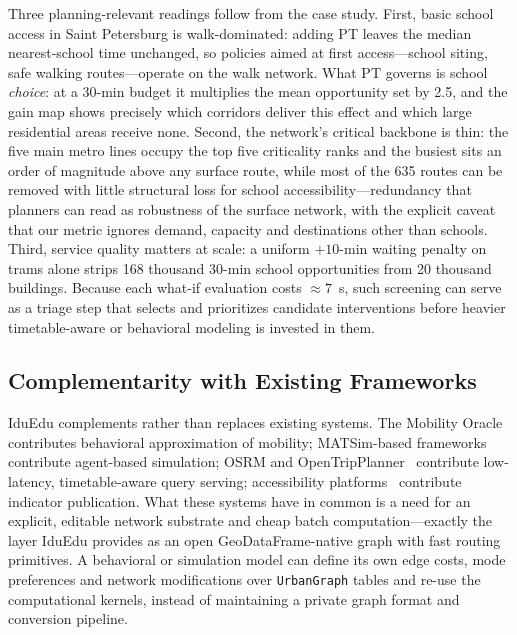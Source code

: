\documentclass[smartcities,article,submit,moreauthors]{Definitions/mdpi}
\begin{document}
    Three planning-relevant readings follow from the case study.
    First, basic school access in Saint Petersburg is walk-dominated: adding PT leaves the median
    nearest-school time unchanged, so policies aimed at first access---school siting, safe walking
    routes---operate on the walk network.
    What PT governs is school \emph{choice}: at a 30-min budget it multiplies the mean opportunity set
    by 2.5, and the gain map shows precisely which corridors deliver this effect and which large
    residential areas receive none.
    Second, the network's critical backbone is thin: the five main metro lines occupy the top five
    criticality ranks and the busiest sits an order of magnitude above any surface route, while most
    of the 635 routes can be removed with little structural loss for school accessibility---redundancy
    that planners can read as robustness of the surface network, with the explicit caveat that our
    metric ignores demand, capacity and destinations other
    than schools.
    Third, service quality matters at scale: a uniform $+10$-min waiting penalty on trams alone strips
    168 thousand 30-min school opportunities from 20 thousand buildings.
    Because each what-if evaluation costs ${\approx}7$~s, such screening can serve as a triage step
    that selects and prioritizes candidate interventions before heavier timetable-aware or behavioral
    modeling is invested in them.

    \subsection{Complementarity with Existing Frameworks}
    \label{subsec:disc-complementarity}

    IduEdu complements rather than replaces existing systems.
    The Mobility Oracle~\cite{gogousou2026mobilityoracle} contributes behavioral approximation of
    mobility; MATSim-based frameworks~\cite{shulajkovska2024framework} contribute agent-based
    simulation; OSRM and OpenTripPlanner~\cite{osrm,otp} contribute low-latency, timetable-aware query
    serving; accessibility platforms~\cite{gumina2026mapping} contribute indicator publication.
    What these systems have in common is a need for an explicit, editable network substrate and cheap
    batch computation---exactly the layer IduEdu provides as an open GeoDataFrame-native graph with fast
    routing primitives.
    A behavioral or simulation model can define its own edge costs, mode preferences and network
    modifications over \texttt{UrbanGraph} tables and re-use the computational kernels, instead of
    maintaining a private graph format and conversion pipeline.
\end{document}
